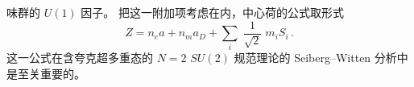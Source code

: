 味群的 $U(1)$ 因子。
把这一附加项考虑在内，中心荷的公式取形式
\begin{equation}
Z = n_e a + n_m a_D + \sum_{i} \;\frac{1}{\sqrt{2}} \; m_i S_i \,.
\label{bps-m}
\end{equation}
这一公式在含夸克超多重态的 $N=2$ $SU(2)$ 规范理论的 Seiberg--Witten 分析中
是至关重要的。
